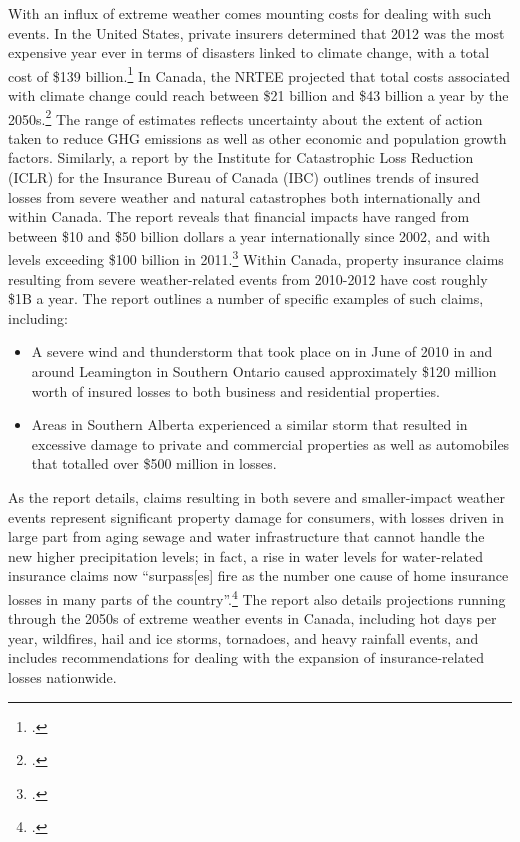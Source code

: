 With an influx of extreme weather comes mounting costs for dealing with such events. 
In the United States, private insurers determined that 2012 was the most expensive year ever in terms of disasters linked to climate change, with a total cost of \$139 billion.\footcite[][]{BlownAway}
In Canada, the NRTEE projected that total costs associated with climate change could reach between \$21 billion and \$43 billion a year by the 2050s.\footcite[][p.15]{NRTEEPrice}
The range of estimates reflects uncertainty about the extent of action taken to reduce GHG emissions as well as other economic and population growth factors. 
Similarly, a report by the Institute for Catastrophic Loss Reduction (ICLR) for the Insurance Bureau of Canada (IBC) outlines trends of insured losses from severe weather and natural catastrophes both internationally and within Canada. 
The report reveals that financial impacts have ranged from between \$10 and \$50 billion dollars a year internationally since 2002, and with levels exceeding \$100 billion in 2011.\footcite[][p. 5]{TellingWeatherStory}
Within Canada, property insurance claims resulting from severe weather-related events from 2010-2012 have cost roughly \$1B a year.
The report outlines a number of specific examples of such claims, including:
\begin{itemize}
	\item A severe wind and thunderstorm that took place on in June of 2010 in and around Leamington in Southern Ontario caused approximately \$120 million worth of insured losses to both business and residential properties.
	\item Areas in Southern Alberta experienced a similar storm that resulted in excessive damage to private and commercial properties as well as automobiles that totalled over \$500 million in losses.
\end{itemize}
As the report details, claims resulting in both severe and smaller-impact weather events represent significant property damage for consumers, with losses driven in large part from aging sewage and water infrastructure that cannot handle the new higher precipitation levels; in fact, a rise in water levels for water-related insurance claims now ``surpass[es] fire as the number one cause of home insurance losses in many parts of the country''.\footcite[][p. 7]{TellingWeatherStory}
The report also details projections running through the 2050s of extreme weather events in Canada, including hot days per year, wildfires, hail and ice storms, tornadoes, and heavy rainfall events, and includes recommendations for dealing with the expansion of insurance-related losses nationwide.


